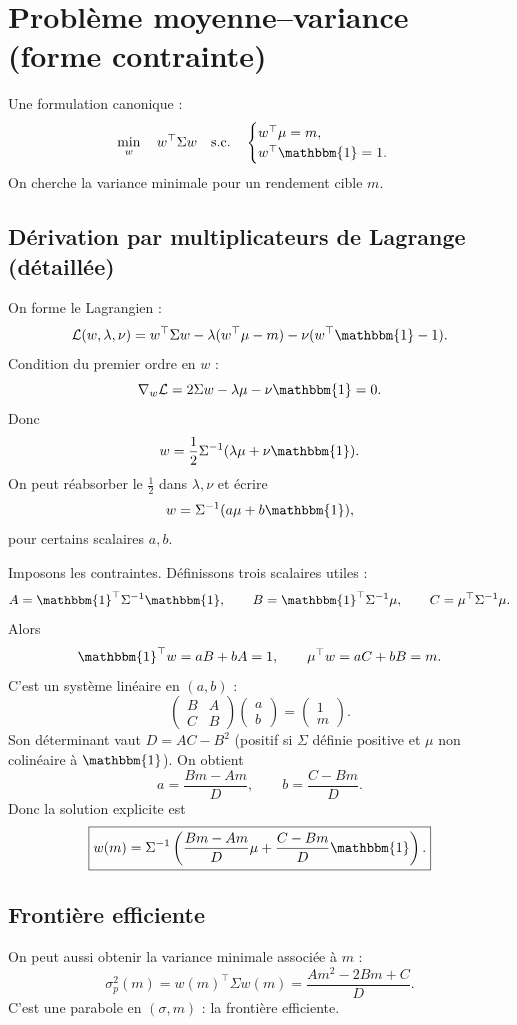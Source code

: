 \documentclass[11pt,a4paper]{report}
\newcommand{\1}{\mathbbm{1}}
\theoremstyle{definition}
\theoremstyle{plain}
\theoremstyle{remark}
\begin{document}
\section{Problème moyenne--variance (forme contrainte)}
\label{sec:mv_constrained}
Une formulation canonique :
\[
\min_{w} \quad w^\top \Sigma w
\quad \text{s.c.}\quad
\begin{cases}
w^\top \mu = m,\\
w^\top \1 = 1.
\end{cases}
\]
On cherche la variance minimale pour un rendement cible $m$.

\subsection{Dérivation par multiplicateurs de Lagrange (détaillée)}
On forme le Lagrangien :
\[
\mathcal{L}(w,\lambda,\nu)= w^\top \Sigma w - \lambda(w^\top \mu - m) - \nu(w^\top \1 - 1).
\]
Condition du premier ordre en $w$ :
\[
\nabla_w \mathcal{L} = 2\Sigma w - \lambda \mu - \nu \1 = 0.
\]
Donc
\[
w = \frac12 \Sigma^{-1}(\lambda \mu + \nu \1).
\]
On peut réabsorber le $\tfrac12$ dans $\lambda,\nu$ et écrire
\[
w = \Sigma^{-1}(a\mu + b\1),
\]
pour certains scalaires $a,b$.

Imposons les contraintes.
Définissons trois scalaires utiles :
\[
A=\1^\top \Sigma^{-1}\1,\qquad
B=\1^\top \Sigma^{-1}\mu,\qquad
C=\mu^\top \Sigma^{-1}\mu.
\]
Alors
\[
\1^\top w = aB + bA = 1,\qquad
\mu^\top w = aC + bB = m.
\]
C'est un système linéaire en $(a,b)$ :
\[
\begin{pmatrix}
B & A\\
C & B
\end{pmatrix}
\begin{pmatrix}
a\\ b
\end{pmatrix}
=
\begin{pmatrix}
1\\ m
\end{pmatrix}.
\]
Son déterminant vaut $D=AC-B^2$ (positif si $\Sigma$ définie positive et $\mu$ non colinéaire à $\1$).
On obtient
\[
a = \frac{Bm-A m}{D},\qquad
b = \frac{C- B m}{D}.
\]
Donc la solution explicite est
\[
\boxed{
w(m)=\Sigma^{-1}\left(\frac{Bm-A m}{D}\mu + \frac{C- B m}{D}\1\right).
}
\]

\subsection{Frontière efficiente}
On peut aussi obtenir la variance minimale associée à $m$ :
\[
\sigma_p^2(m)=w(m)^\top \Sigma w(m)=\frac{A m^2 - 2B m + C}{D}.
\]
C'est une parabole en $(\sigma, m)$ : la frontière efficiente.
\end{document}
